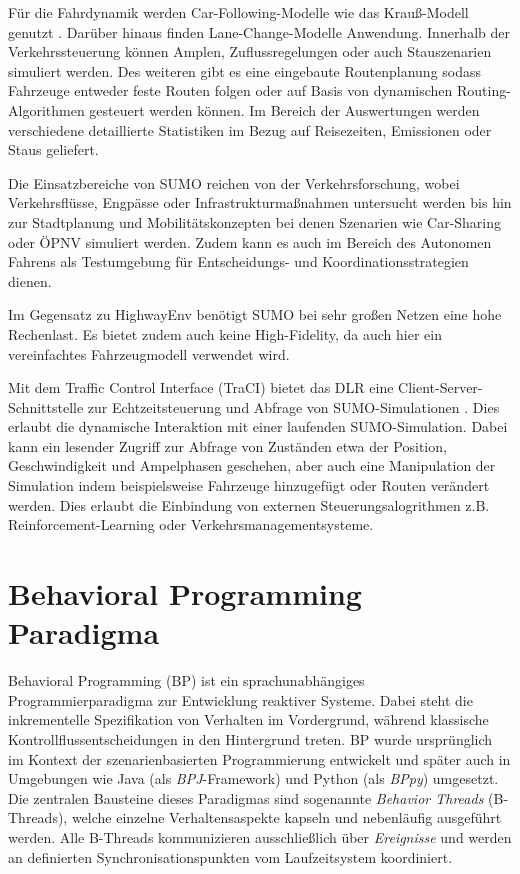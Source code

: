 Für die Fahrdynamik werden Car-Following-Modelle wie das Krauß-Modell genutzt \cite{sumo_car_following}. Darüber hinaus finden Lane-Change-Modelle Anwendung. Innerhalb der Verkehrssteuerung können Amplen, Zuflussregelungen oder auch Stauszenarien simuliert werden. Des weiteren gibt es eine eingebaute Routenplanung sodass Fahrzeuge entweder feste Routen folgen oder auf Basis von dynamischen Routing-Algorithmen gesteuert werden können. Im Bereich der Auswertungen werden verschiedene detaillierte Statistiken im Bezug auf Reisezeiten, Emissionen oder Staus geliefert.

Die Einsatzbereiche von SUMO reichen von der Verkehrsforschung, wobei Verkehrsflüsse, Engpässe oder Infrastrukturmaßnahmen untersucht werden bis hin zur Stadtplanung und Mobilitätskonzepten bei denen Szenarien wie Car-Sharing oder ÖPNV simuliert werden. Zudem kann es auch im Bereich des Autonomen Fahrens als Testumgebung für Entscheidungs- und Koordinationsstrategien dienen.

Im Gegensatz zu HighwayEnv benötigt SUMO bei sehr großen Netzen eine hohe Rechenlast. Es bietet zudem auch keine High-Fidelity, da auch hier ein vereinfachtes Fahrzeugmodell verwendet wird.

Mit dem Traffic Control Interface (TraCI) bietet das DLR eine Client-Server-Schnittstelle zur Echtzeitsteuerung und Abfrage von SUMO-Simulationen \cite{sumo_traci}. Dies erlaubt die dynamische Interaktion mit einer laufenden SUMO-Simulation. Dabei kann ein lesender Zugriff zur Abfrage von Zuständen etwa der Position, Geschwindigkeit und Ampelphasen geschehen, aber auch eine Manipulation der Simulation indem beispielsweise Fahrzeuge hinzugefügt oder Routen verändert werden. Dies erlaubt die Einbindung von externen Steuerungsalogrithmen z.B. Reinforcement-Learning oder Verkehrsmanagementsysteme.

\section{Behavioral Programming Paradigma}\label{sec:behavioral-programming}
Behavioral Programming (BP) ist ein sprachunabhängiges Programmierparadigma zur Entwicklung reaktiver Systeme\cite{Harel2012}.
Dabei steht die inkrementelle Spezifikation von Verhalten im Vordergrund, während klassische Kontrollflussentscheidungen in den Hintergrund treten\cite{Harel2012}.
BP wurde ursprünglich im Kontext der szenarienbasierten Programmierung entwickelt und später auch in Umgebungen wie Java (als \emph{BPJ}-Framework) und Python (als \emph{BPpy}) umgesetzt\cite{Harel2010}.
Die zentralen Bausteine dieses Paradigmas sind sogenannte \emph{Behavior Threads} (B-Threads), welche einzelne Verhaltensaspekte kapseln und nebenläufig ausgeführt werden\cite{Harel2010}.
Alle B-Threads kommunizieren ausschließlich über \emph{Ereignisse} und werden an definierten Synchronisationspunkten vom Laufzeitsystem koordiniert\cite{Harel2012}.


